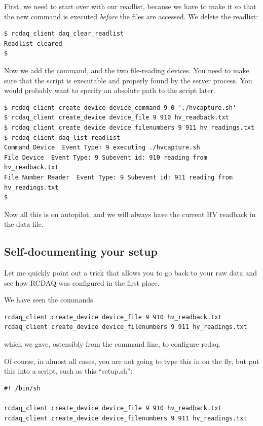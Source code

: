 \documentclass{article}[11pt]
\begin{document}
First, we need to start over with our readlist, because we have to make it so that the
new command is executed \emph{before} the files are accessed. We delete the readlist:

\begin{verbatim}
$ rcdaq_client daq_clear_readlist
Readlist cleared
$
\end{verbatim}

Now we add the command, and the two file-reading devices. You need to make sure
that the script is executable and properly found by the server process. You would probably 
want to specify an absolute path to the script later. 

\begin{verbatim}
$ rcdaq_client create_device device_command 9 0 './hvcapture.sh'
$ rcdaq_client create_device device_file 9 910 hv_readback.txt
$ rcdaq_client create_device device_filenumbers 9 911 hv_readings.txt
$ rcdaq_client daq_list_readlist
Command Device  Event Type: 9 executing ./hvcapture.sh
File Device  Event Type: 9 Subevent id: 910 reading from  hv_readback.txt
File Number Reader  Event Type: 9 Subevent id: 911 reading from  hv_readings.txt
$ 
\end{verbatim}

Now all this  is on autopilot, and we will always  have the current HV
readback in the data file.

 
\subsection{Self-documenting your setup}

Let me quickly point out a trick that allows you to go back to your 
raw data and see how RCDAQ was configured in the first place.

We have seen the commands

\begin{verbatim}
rcdaq_client create_device device_file 9 910 hv_readback.txt 
rcdaq_client create_device device_filenumbers 9 911 hv_readings.txt
\end{verbatim}

which we gave, ostensibly from the command line, to configure rcdaq.

Of course, in almost all cases, you are not going to type this in on
the fly, but put this into a script, such as this ``setup.sh'':

\begin{verbatim} 
#! /bin/sh

rcdaq_client create_device device_file 9 910 hv_readback.txt 
rcdaq_client create_device device_filenumbers 9 911 hv_readings.txt
\end{verbatim}
\end{document}
